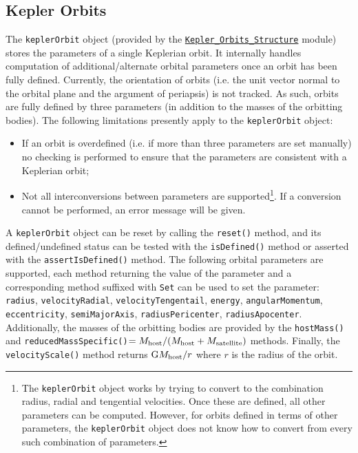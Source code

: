 \subsection{Kepler Orbits}\label{sec:KeplerOrbits}

The {\tt keplerOrbit} object (provided by the \href{objects.kepler_orbits.F90:kepler_orbits_structure}{{\tt Kepler\_Orbits\_Structure}} module) stores the parameters of a single Keplerian orbit. It internally handles computation of additional/alternate orbital parameters once an orbit has been fully defined. Currently, the orientation of orbits (i.e. the unit vector normal to the orbital plane and the argument of periapsis) is not tracked. As such, orbits are fully defined by three parameters (in addition to the masses of the orbitting bodies). The following limitations presently apply to the {\tt keplerOrbit} object:
\begin{itemize}
 \item If an orbit is overdefined (i.e. if more than three parameters are set manually) no checking is performed to ensure that the parameters are consistent with a Keplerian orbit;
 \item Not all interconversions between parameters are supported\footnote{The {\tt keplerOrbit} object works by trying to convert to the combination radius, radial and tengential velocities. Once these are defined, all other parameters can be computed. However, for orbits defined in terms of other parameters, the {\tt keplerOrbit} object does not know how to convert from every such combination of parameters.}. If a conversion cannot be performed, an error message will be given. 
\end{itemize}
A {\tt keplerOrbit} object can be reset by calling the {\tt reset()} method, and its defined/undefined status can be tested with the {\tt isDefined()} method or asserted with the {\tt assertIsDefined()} method. The following orbital parameters are supported, each method returning the value of the parameter and a corresponding method suffixed with {\tt Set} can be used to set the parameter: {\tt radius}, {\tt velocityRadial}, {\tt velocityTengentail}, {\tt energy}, {\tt angularMomentum}, {\tt eccentricity}, {\tt semiMajorAxis}, {\tt radiusPericenter}, {\tt radiusApocenter}. Additionally, the masses of the orbitting bodies are provided by the {\tt hostMass()} and {\tt reducedMassSpecific()}$=M_{\rm host}/(M_{\rm host}+M_{\rm satellite})$ methods. Finally, the {\tt velocityScale()} method returns ${\rm G}M_{\rm host}/r$ where $r$ is the radius of the orbit.

